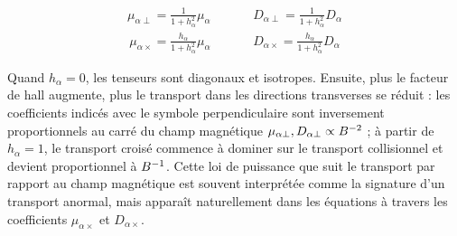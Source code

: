\begin{refsection}
\begin{align}
\mu_{\alpha\perp}=\frac{1}{1+h_\alpha^2}\mu_\alpha\;\;\;\;\;\;\;\;
\;\;\;\;D_{\alpha\perp}=\frac{1}{1+h_\alpha^2}D_\alpha
\end{align}
\begin{align}
\mu_{\alpha\times}=\frac{h_\alpha}{1+h_\alpha^2}\mu_\alpha\;\;\;\;
\;\;\;\;\;\;\;\;D_{\alpha\times}=\frac{h_\alpha}{1+h_\alpha^2}D_\alpha
\end{align}

Quand $h_\alpha=0$, les tenseurs sont diagonaux et isotropes. Ensuite, plus le
facteur de hall augmente, plus le transport dans les directions transverses se
réduit :
les coefficients indicés avec le symbole perpendiculaire sont inversement
proportionnels au carré du champ magnétique $\mu_{\alpha\perp},
D_{\alpha\perp}\propto B^{{-2}}$ ; à partir de $h_\alpha=1$, le
transport croisé commence à dominer sur le transport collisionnel et devient proportionnel à
$B^{{-1}}$. Cette loi de puissance que suit le transport par rapport au
champ magnétique est souvent interprétée comme la signature d'un transport
anormal, mais apparaît naturellement dans les équations à travers les
coefficients $\mu_{\alpha\times}$ et $D_{\alpha\times}$.



%
%
\end{refsection}

